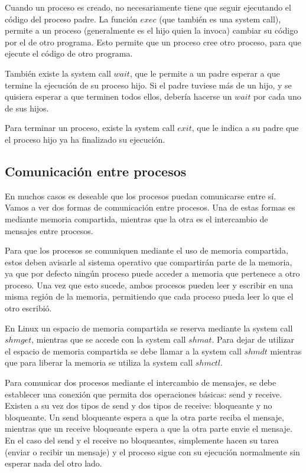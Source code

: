 \documentclass{article}
\begin{document}
Cuando un proceso es creado, no necesariamente tiene que seguir ejecutando el c\'odigo del proceso padre. La funci\'on $exec$ (que tambi\'en es una system call), permite a un proceso (generalmente es el hijo quien la invoca) cambiar su c\'odigo por el de otro programa. Esto permite que un proceso cree otro proceso, para que ejecute el c\'odigo de otro programa.

Tambi\'en existe la system call $wait$, que le permite a un padre esperar a que termine la ejecuci\'on de su proceso hijo. Si el padre tuviese m\'as de un hijo, y se quisiera esperar a que terminen todos ellos, deber\'ia hacerse un $wait$ por cada uno de sus hijos.

Para terminar un proceso, existe la system call $exit$, que le indica a su padre que el proceso hijo ya ha finalizado su ejecuci\'on.

\subsection{Comunicaci\'on entre procesos}

En muchos casos es deseable que los procesos puedan comunicarse entre s\'i. Vamos a ver dos formas de comunicaci\'on entre procesos. Una de estas formas es mediante memoria compartida, mientras que la otra es el intercambio de mensajes entre procesos.

Para que los procesos se comuniquen mediante el uso de memoria compartida, estos deben avisarle al sistema operativo que compartir\'an parte de la memoria, ya que por defecto ning\'un proceso puede acceder a memoria que pertenece a otro proceso. Una vez que esto sucede, ambos procesos pueden leer y escribir en una misma regi\'on de la memoria, permitiendo que cada proceso pueda leer lo que el otro escribi\'o.

En Linux un espacio de memoria compartida se reserva mediante la system call $shmget$, mientras que se accede con la system call $shmat$. Para dejar de utilizar el espacio de memoria compartida se debe llamar a la system call $shmdt$ mientras que para liberar la memoria se utiliza la system call $shmctl$.

Para comunicar dos procesos mediante el intercambio de mensajes, se debe establecer una conexi\'on que permita dos operaciones b\'asicas: send y receive. Existen a su vez dos tipos de send y dos tipos de receive: bloqueante y no bloqueante. Un send bloqueante espera a que la otra parte reciba el mensaje, mientras que un receive bloqueante espera a que la otra parte envie el mensaje. En el caso del send y el receive no bloqueantes, simplemente hacen su tarea (enviar o recibir un mensaje) y el proceso sigue con su ejecuci\'on normalmente sin esperar nada del otro lado.
\end{document}
